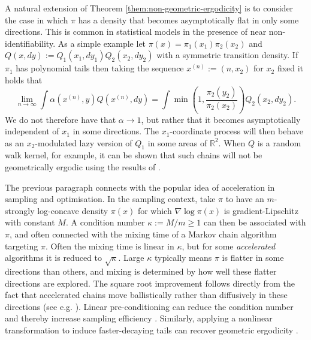 \documentclass{article}
\theoremstyle{definition}
\theoremstyle{plain}
\newtheorem{lemma}[definition]{Lemma}
\begin{document}
A natural extension of Theorem \ref{them:non-geometric-ergodicity} is to consider the case in which $\pi$ has a density that becomes asymptotically flat in only some directions.  This is common in statistical models in the presence of near non-identifiability. As a simple example let $\pi(x) = \pi_1(x_1)\pi_2(x_2)$ and $Q(x,dy) := Q_1(x_1,dy_1)Q_2(x_2,dy_2)$ with a symmetric transition density.  If $\pi_1$ has polynomial tails then taking the sequence $x^{(n)} := (n, x_2)$ for $x_2$ fixed it holds that 
\[
\lim_{n\to\infty}\int \alpha(x^{(n)}, y)Q(x^{(n)}, dy) = \int \min\left(1, \frac{\pi_2(y_2)}{\pi_2(x_2)}\right)Q_2(x_2, dy_2).
\]
We do not therefore have that $\alpha \to 1$, but rather that it becomes asymptotically independent of $x_1$ in some directions. The $x_1$-coordinate process will then behave as an $x_2$-modulated lazy version of $Q_1$ in some areas of $\mathbb{R}^2$.  When $Q$ is a random walk kernel, for example, it can be shown that such chains will not be geometrically ergodic using the results of \cite{jarner2003necessary}.  

The previous paragraph connects with the popular idea of acceleration in sampling and optimisation. In the sampling context, take $\pi$ to have an $m$-strongly log-concave density $\pi(x)$ for which $\nabla \log\pi(x)$ is gradient-Lipschitz with constant $M$. A condition number $\kappa := M/m \geq 1$ can then be associated with $\pi$, and often connected with the mixing time of a Markov chain algorithm targeting $\pi$. Often the mixing time is linear in $\kappa$, but for some \textit{accelerated} algorithms it is reduced to $\sqrt{\kappa}$.  Large $\kappa$ typically means $\pi$ is flatter in some directions than others, and mixing is determined by how well these flatter directions are explored. The square root improvement follows directly from the fact that accelerated chains move ballistically rather than diffusively in these directions (see e.g. \cite{oberdorster2025accelerated}).  Linear pre-conditioning can reduce the condition number and thereby increase sampling efficiency \cite{hird2025quantifying}. Similarly, applying a nonlinear transformation to induce faster-decaying tails can recover geometric ergodicity \cite{johnson2012variable}.


\end{document}
